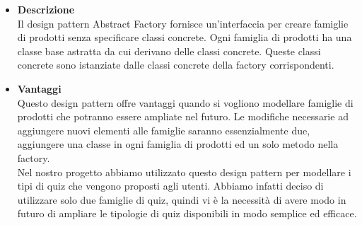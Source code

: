 		\begin{itemize}
			\item \textbf{Descrizione}\\ 
			Il design pattern Abstract Factory fornisce un'interfaccia per creare famiglie di prodotti senza specificare classi concrete. Ogni famiglia di prodotti ha una classe base astratta da cui derivano delle classi concrete. Queste classi concrete sono istanziate dalle classi concrete della factory corrispondenti.
			
			\item \textbf{Vantaggi}\\ 
			Questo design pattern offre vantaggi quando si vogliono modellare famiglie di prodotti che potranno essere ampliate nel futuro. Le modifiche necessarie ad aggiungere nuovi elementi alle famiglie saranno essenzialmente due, aggiungere una classe in ogni famiglia di prodotti ed un solo metodo nella factory.
			\utilizzo \\ 
			Nel nostro progetto abbiamo utilizzato questo design pattern per modellare i tipi di quiz che vengono proposti agli utenti. Abbiamo infatti deciso di utilizzare solo due famiglie di quiz, quindi vi è la necessità di avere modo in futuro di ampliare le tipologie di quiz disponibili in modo semplice ed efficace.
			
		\end{itemize}
		
